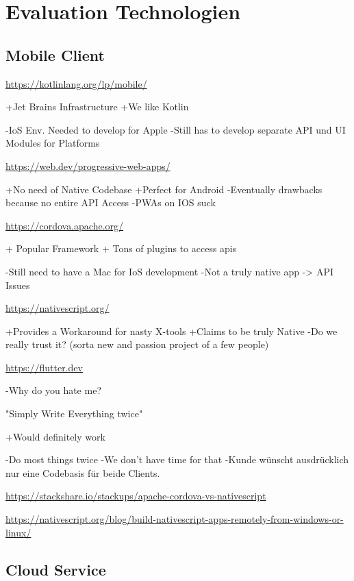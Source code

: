 \section{Evaluation Technologien}\label{sec:evaluation-technologien}

\subsection{Mobile Client}\label{subsec:mobile-client2}



\url{https://kotlinlang.org/lp/mobile/}
	

    +Jet Brains Infrastructure 
    +We like Kotlin 

    -IoS Env. Needed to develop for Apple 
    -Still has to develop separate API und UI Modules for Platforms 

\url{https://web.dev/progressive-web-apps/ }
	
    +No need of Native Codebase
    +Perfect for Android 
    -Eventually drawbacks because no entire API Access 
    -PWAs on IOS suck

\url{https://cordova.apache.org/} 
	

    + Popular Framework 
    + Tons of plugins to access apis 

    -Still need to have a Mac for IoS development  
    -Not a truly native app -> API Issues
 

\url{https://nativescript.org/ }

    +Provides a Workaround for nasty X-tools 
    +Claims to be truly Native 
    -Do we really trust it? (sorta new and passion project of a few people) 

 
 \url{https://flutter.dev}

    -Why do you hate me?


"Simply Write Everything twice"

    +Would definitely work

    -Do most things twice
    -We don't have time for that
    -Kunde wünscht ausdrücklich nur eine Codebasis für beide Clients.

\url{https://stackshare.io/stackups/apache-cordova-vs-nativescript}

\url{https://nativescript.org/blog/build-nativescript-apps-remotely-from-windows-or-linux/ }

\subsection{Cloud Service}\label{subsec:cloud-service2}

